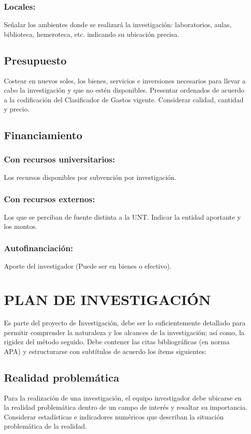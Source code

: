 \documentclass[a4paper, 12pt]{article}
\begin{document}
\subsubsection{{\bf Locales:}} Señalar los ambientes donde se realizará la investigación: laboratorios, aulas, biblioteca, hemeroteca, etc.  indicando su ubicación precisa.

\subsection{Presupuesto}
Costear en nuevos soles, los bienes, servicios e inversiones necesarios para llevar a cabo la investigación y que no estén disponibles. Presentar ordenados de acuerdo a la codificación del  Clasificador de Gastos vigente. Considerar calidad, cantidad y  precio.

\subsection{Financiamiento}
\subsubsection{ {\bf	Con recursos universitarios:}}  Los recursos disponibles por subvención por investigación.
\subsubsection{ {\bf Con recursos externos:}} Los que se perciban de fuente distinta a la UNT. Indicar la entidad aportante y los montos.
\subsubsection{ {\bf Autofinanciación:}} Aporte del investigador (Puede ser en bienes o efectivo).




\section{PLAN DE INVESTIGACIÓN}
Es  parte del proyecto de Investigación,  debe ser lo suficientemente detallado para permitir comprender la naturaleza y los alcances de la investigación; así como, la rigidez del método seguido. Debe contener las citas bibliográficas (en norma APA) y estructurarse con  subtítulos de acuerdo los ítems siguientes:

\subsection{Realidad problemática}
Para la realización de una investigación, el equipo investigador debe ubicarse en la realidad problemática dentro de un campo de interés y resaltar su importancia. Considerar estadísticas e indicadores numéricos que describan la situación problemática de la realidad.
\end{document}
